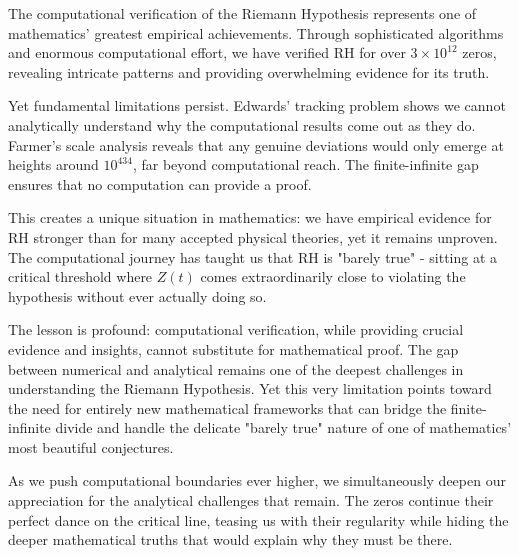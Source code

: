 The computational verification of the Riemann Hypothesis represents one of mathematics' greatest empirical achievements. Through sophisticated algorithms and enormous computational effort, we have verified RH for over $3 \times 10^{12}$ zeros, revealing intricate patterns and providing overwhelming evidence for its truth.

Yet fundamental limitations persist. Edwards' tracking problem shows we cannot analytically understand why the computational results come out as they do. Farmer's scale analysis reveals that any genuine deviations would only emerge at heights around $10^{434}$, far beyond computational reach. The finite-infinite gap ensures that no computation can provide a proof.

This creates a unique situation in mathematics: we have empirical evidence for RH stronger than for many accepted physical theories, yet it remains unproven. The computational journey has taught us that RH is "barely true" - sitting at a critical threshold where $Z(t)$ comes extraordinarily close to violating the hypothesis without ever actually doing so.

The lesson is profound: computational verification, while providing crucial evidence and insights, cannot substitute for mathematical proof. The gap between numerical and analytical remains one of the deepest challenges in understanding the Riemann Hypothesis. Yet this very limitation points toward the need for entirely new mathematical frameworks that can bridge the finite-infinite divide and handle the delicate "barely true" nature of one of mathematics' most beautiful conjectures.

As we push computational boundaries ever higher, we simultaneously deepen our appreciation for the analytical challenges that remain. The zeros continue their perfect dance on the critical line, teasing us with their regularity while hiding the deeper mathematical truths that would explain why they must be there.